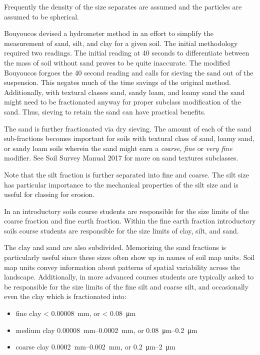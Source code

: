 \documentclass[letterpaper, 12pt]{article}
\begin{document}
Frequently the density of the size separates are assumed and the particles are assumed to be spherical.

Bouyoucos devised a hydrometer method in an effort to simplify the measurement of sand, silt, and clay for a given soil. The initial methodology required two readings. The initial reading at 40 seconds to differentiate between the mass of soil without sand proves to be quite inaccurate. The modified Bouyoucos forgoes the 40 second reading and calls for sieving the sand out of the suspension. This negates much of the time savings of the original method. Additionally, with textural classes sand, sandy loam, and loamy sand the sand might need to be fractionated anyway for proper subclass modification of the sand. Thus, sieving to retain the sand can have practical benefits.

The sand is further fractionated via dry sieving. The amount of each of the sand sub-fractions becomes important for soils with textural class of sand, loamy sand, or sandy loam soils wherein the sand might earn a \textit{coarse}, \textit{fine} or \textit{very fine} modifier. See Soil Survey Manual 2017 for more on sand textures subclasses.

Note that the silt fraction is further separated into fine and coarse. The silt size has particular importance to the mechanical properties of the silt size and is useful for classing for erosion.

In an introductory soils course students are responsible for the size limits of the coarse fraction and fine earth fraction. Within the fine earth fraction introductory soils course students are responsible for the size limits of clay, silt, and sand.

The clay and sand are also subdivided. Memorizing the sand fractions is particularly useful since these sizes often show up in names of soil map units. Soil map units convey information about patterns of spatial variability across the landscape. Additionally, in more advanced courses students are typically asked to be responsible for the size limits of the fine silt and coarse silt, and occasionally even the clay which is fractionated into:
    
\begin{itemize}
    \item fine clay \qty{< 0.00008}{mm}, or \qty{< 0.08}{\micro\meter}
    \item medium clay \qtyrange{0.00008}{0.0002}{mm}, or \qtyrange{0.08}{0.2}{\micro\meter}
    \item coarse clay \qtyrange{0.0002}{0.002}{mm}, or \qtyrange{0.2}{2}{\micro\meter}
\end{itemize}
    
\end{document}
